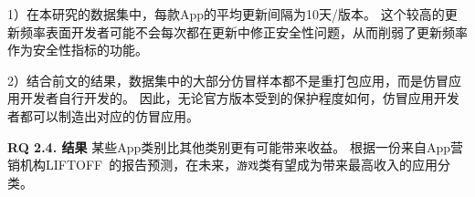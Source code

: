 1）在本研究的数据集中，每款App的平均更新间隔为10天/版本。
这个较高的更新频率表面开发者可能不会每次都在更新中修正安全性问题，从而削弱了更新频率作为安全性指标的功能。

2）结合前文的结果，数据集中的大部分仿冒样本都不是重打包应用，而是仿冒应用开发者自行开发的。
因此，无论官方版本受到的保护程度如何，仿冒应用开发者都可以制造出对应的仿冒应用。

{\bf RQ 2.4. 结果}
某些App类别比其他类别更有可能带来收益。
根据一份来自App营销机构LIFTOFF~\cite{LIFTOFF_report}的报告预测，在未来，\texttt{游戏}类有望成为带来最高收入的应用分类。


